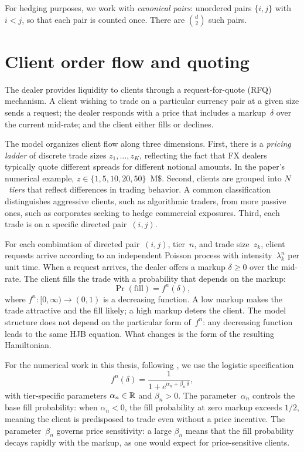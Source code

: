 For hedging purposes, we work with \emph{canonical pairs}: unordered pairs $\{i, j\}$ with $i < j$, so that each pair is counted once. There are $\binom{d}{2}$ such pairs.


\section{Client order flow and quoting}
\label{sec:model-quoting}

The dealer provides liquidity to clients through a request-for-quote (RFQ) mechanism. A client wishing to trade on a particular currency pair at a given size sends a request; the dealer responds with a price that includes a markup~$\delta$ over the current mid-rate; and the client either fills or declines.

The model organizes client flow along three dimensions. First, there is a \emph{pricing ladder} of discrete trade sizes $z_1, \ldots, z_K$, reflecting the fact that FX dealers typically quote different spreads for different notional amounts. In the paper's numerical example, $z \in \{1, 5, 10, 20, 50\}$~M\$. Second, clients are grouped into $N$~\emph{tiers} that reflect differences in trading behavior. A common classification distinguishes aggressive clients, such as algorithmic traders, from more passive ones, such as corporates seeking to hedge commercial exposures. Third, each trade is on a specific directed pair~$(i,j)$.

For each combination of directed pair~$(i,j)$, tier~$n$, and trade size~$z_k$, client requests arrive according to an independent Poisson process with intensity~$\lambda^n_k$ per unit time. When a request arrives, the dealer offers a markup $\delta \geq 0$ over the mid-rate. The client fills the trade with a probability that depends on the markup:
\[
  \Pr(\text{fill}) = f^n(\delta),
\]
where $f^n \colon [0, \infty) \to (0, 1)$ is a decreasing function. A low markup makes the trade attractive and the fill likely; a high markup deters the client. The model structure does not depend on the particular form of~$f^n$: any decreasing function leads to the same HJB equation. What changes is the form of the resulting Hamiltonian.

For the numerical work in this thesis, following \cite{barzykin2023}, we use the logistic specification
\begin{equation}
  \label{eq:logistic}
  f^n(\delta) = \frac{1}{1 + e^{\alpha_n + \beta_n\,\delta}},
\end{equation}
with tier-specific parameters $\alpha_n \in \mathbb{R}$ and $\beta_n > 0$. The parameter~$\alpha_n$ controls the base fill probability: when $\alpha_n < 0$, the fill probability at zero markup exceeds $1/2$, meaning the client is predisposed to trade even without a price incentive. The parameter~$\beta_n$ governs price sensitivity: a large $\beta_n$ means that the fill probability decays rapidly with the markup, as one would expect for price-sensitive clients.

